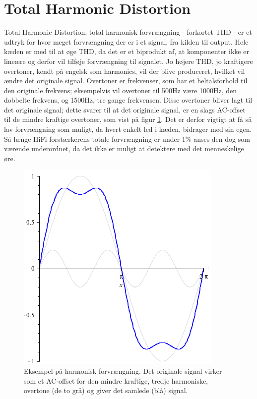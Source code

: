 \section{Total Harmonic Distortion}
\label{thd}
Total Harmonic Distortion, total harmonisk forvrængning - forkortet THD - er et udtryk for hvor meget forvrængning der er i et signal, fra kilden til output.  Hele kæden er med til at øge THD, da det er et biprodukt af, at komponenter ikke er lineære og derfor vil tilføje forvrængning til signalet. Jo højere THD, jo kraftigere overtoner, kendt på engelsk som harmonics, vil der blive produceret, hvilket vil ændre det originale signal. Overtoner er frekvenser, som har et heltalsforhold til den originale frekvens; eksempelvis vil overtoner til 500Hz være 1000Hz, den dobbelte frekvens, og 1500Hz, tre gange frekvensen. Disse overtoner bliver lagt til det originale signal; dette svarer til at det originale signal, er en slags AC-offset til de mindre kraftige overtoner, som vist på figur \ref{fig:harmonic_distortion}. Det er derfor vigtigt at få så lav forvrængning som muligt, da hvert enkelt led i kæden, bidrager med sin egen. Så længe HiFi-forstærkerens totale forvrængning er under 1\% anses den dog som værende underordnet, da det ikke er muligt at detektere med det menneskelige øre.

\begin{figure}[h]
\centering
\includegraphics[scale=.4]{valg_af_loesning/thd/thdsamlet.png}
\caption{Eksempel på harmonisk forvrængning. Det originale signal virker som et AC-offset for den mindre kraftige, tredje harmoniske, overtone (de to grå) og giver det samlede (blå) signal.}
\label{fig:harmonic_distortion}
\end{figure}